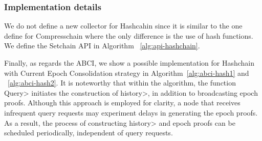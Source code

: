 

\subsubsection{Implementation details}\label{subsubsec:details}

We do not define a new collector for Hashcahin since it is similar to the one
define for Compresschain where the only difference is the use of hash functions.
%
We define the Setchain API in Algorithm ~\ref{alg:api-hashchain}.

Finally, as regards the ABCI, we show a possible implementation for Hashchain
with Current Epoch Consolidation strategy in Algorithm~\ref{alg:abci-hash1} and ~\ref{alg:abci-hash2}. It is
noteworthy that within the algorithm, the function \<Query> initiates the construction
of \<history>, in addition to broadcasting epoch proofs. Although this approach is employed
for clarity, a node that receives infrequent query requests may experiment delays in
generating the epoch proofs. As a result, the process of constructing \<history> and
epoch proofs can be scheduled periodically, independent of query requests.



%
